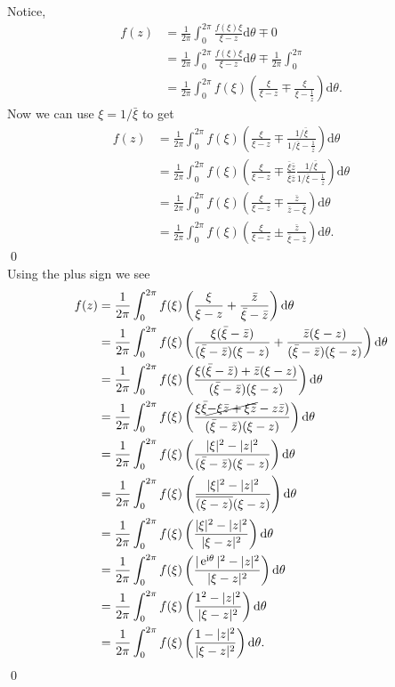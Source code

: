 \documentclass[10pt]{amsart}
\newcommand{\D}{\mathrm{d}}
\newcommand{\I}{\mathrm{i}}
\DeclareMathOperator{\E}{e}
\theoremstyle{nonumberplain}
\begin{document}
\begin{enumerate}[label={\bf {\arabic*}:}]
\noindent
Notice,
\begin{align*}
f(z) &= \frac 1 {2\pi} \int_0^{2\pi} \frac{f(\xi)\xi}{\xi - z} \D \theta \mp 0 \\
	&= \frac 1 {2\pi} \int_0^{2\pi} \frac{f(\xi)\xi}{\xi - z} \D \theta \mp \frac 1 {2\pi} \int_0^{2\pi} \\
	&= \frac 1 {2\pi} \int_0^{2\pi} f(\xi) \left( \frac{\xi}{\xi - z} \mp \frac{\xi}{\xi - \frac 1 {\bar z}} \right)\D \theta.
\end{align*}
Now we can use $\xi = 1/{\bar \xi}$ to get
\begin{align*}
f(z) &= \frac 1 {2\pi} \int_0^{2\pi} f(\xi) \left( \frac{\xi}{\xi - z} \mp \frac{1/{\bar \xi}}{1/{\bar \xi} - \frac 1 {\bar z}} \right) \D \theta \\
	&= \frac 1 {2\pi} \int_0^{2\pi} f(\xi) \left( \frac{\xi}{\xi - z} \mp \frac {\bar \xi \bar z}{\bar \xi \bar z} \frac{1/{\bar \xi}}{1/{\bar \xi} - \frac 1 {\bar z}} \right) \D \theta \\
	&= \frac 1 {2\pi} \int_0^{2\pi} f(\xi) \left( \frac{\xi}{\xi - z} \mp \frac{\bar z}{\bar z - \bar \xi} \right) \D \theta \\
	&= \frac 1 {2\pi} \int_0^{2\pi} f(\xi) \left( \frac{\xi}{\xi - z} \pm \frac{\bar z}{\bar \xi - \bar z} \right) \D \theta.
\end{align*}
\qed \\
Using the plus sign we see
\begin{align*}
f(z) &= \frac 1 {2\pi} \int_0^{2\pi} f(\xi) \left( \frac{\xi}{\xi - z} + \frac{\bar z}{\bar \xi - \bar z} \right) \D \theta \\
	&= \frac 1 {2\pi} \int_0^{2\pi} f(\xi) \left( \frac{\xi (\bar \xi - \bar z)}{(\bar \xi - \bar z)(\xi - z)} + \frac{\bar z (\xi - z)}{(\bar \xi - \bar z)(\xi - z)} \right) \D \theta \\
	&= \frac 1 {2\pi} \int_0^{2\pi} f(\xi) \left( \frac{\xi (\bar \xi - \bar z)+ \bar z (\xi - z)}{(\bar \xi - \bar z)(\xi - z)}\right) \D \theta \\
	&= \frac 1 {2\pi} \int_0^{2\pi} f(\xi) \left( \frac{\xi\bar \xi \cancel{- \xi \bar z + \xi \bar z} - z \bar z)}{(\bar \xi - \bar z)(\xi - z)}\right) \D \theta \\
	&= \frac 1 {2\pi} \int_0^{2\pi} f(\xi) \left( \frac{|\xi|^2 - |z|^2}{(\bar \xi - \bar z)(\xi - z)}\right) \D \theta \\
	&= \frac 1 {2\pi} \int_0^{2\pi} f(\xi) \left( \frac{|\xi|^2 - |z|^2}{\overline{(\xi - z)}(\xi - z)}\right) \D \theta \\
	&= \frac 1 {2\pi} \int_0^{2\pi} f(\xi) \left( \frac{|\xi|^2 - |z|^2}{|\xi - z|^2}\right) \D \theta \\
	&= \frac 1 {2\pi} \int_0^{2\pi} f(\xi) \left( \frac{|\E^{\I\theta}|^2 - |z|^2}{|\xi - z|^2}\right) \D \theta \\
	&= \frac 1 {2\pi} \int_0^{2\pi} f(\xi) \left( \frac{1^2 - |z|^2}{|\xi - z|^2}\right) \D \theta \\
	&= \frac 1 {2\pi} \int_0^{2\pi} f(\xi) \left( \frac{1 - |z|^2}{|\xi - z|^2}\right) \D \theta.
\end{align*}
\qed \\


\end{enumerate}
\end{document}
